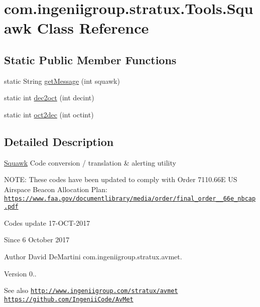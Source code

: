 \hypertarget{classcom_1_1ingeniigroup_1_1stratux_1_1_tools_1_1_squawk}{}\section{com.\+ingeniigroup.\+stratux.\+Tools.\+Squawk Class Reference}
\label{classcom_1_1ingeniigroup_1_1stratux_1_1_tools_1_1_squawk}
\subsection*{Static Public Member Functions}
\begin{DoxyCompactItemize}
\item 
static String \hyperlink{classcom_1_1ingeniigroup_1_1stratux_1_1_tools_1_1_squawk_a402f182028ce4abcdc73a74ee029897f}{get\+Message} (int squawk)
\item 
static int \hyperlink{classcom_1_1ingeniigroup_1_1stratux_1_1_tools_1_1_squawk_a5a9f9bf68e5f1846ee5eb8c1362d2285}{dec2oct} (int decint)
\item 
static int \hyperlink{classcom_1_1ingeniigroup_1_1stratux_1_1_tools_1_1_squawk_ad3bb6928421e825b9362cfe4fc96649f}{oct2dec} (int octint)
\end{DoxyCompactItemize}


\subsection{Detailed Description}
\hyperlink{classcom_1_1ingeniigroup_1_1stratux_1_1_tools_1_1_squawk}{Squawk} Code conversion / translation \& alerting utility

N\+O\+TE\+: These codes have been updated to comply with Order 7110.\+66E US Airspace Beacon Allocation Plan\+: \href{https://www.faa.gov/documentlibrary/media/order/final_order_7110_66e_nbcap.pdf}{\tt https\+://www.\+faa.\+gov/documentlibrary/media/order/final\+\_\+order\+\_\+\_\+66e\+\_\+nbcap.\+pdf}

Codes update 17-\/\+O\+C\+T-\/2017

\begin{DoxySince}{Since}
6 October 2017 
\end{DoxySince}
\begin{DoxyAuthor}{Author}
David De\+Martini  com.\+ingeniigroup.\+stratux.\+avmet. 
\end{DoxyAuthor}
\begin{DoxyVersion}{Version}
0.. 
\end{DoxyVersion}
\begin{DoxySeeAlso}{See also}
\href{http://www.ingeniigroup.com/stratux/avmet}{\tt http\+://www.\+ingeniigroup.\+com/stratux/avmet}  \href{https://github.com/IngeniiCode/AvMet}{\tt https\+://github.\+com/\+Ingenii\+Code/\+Av\+Met} 
\end{DoxySeeAlso}


